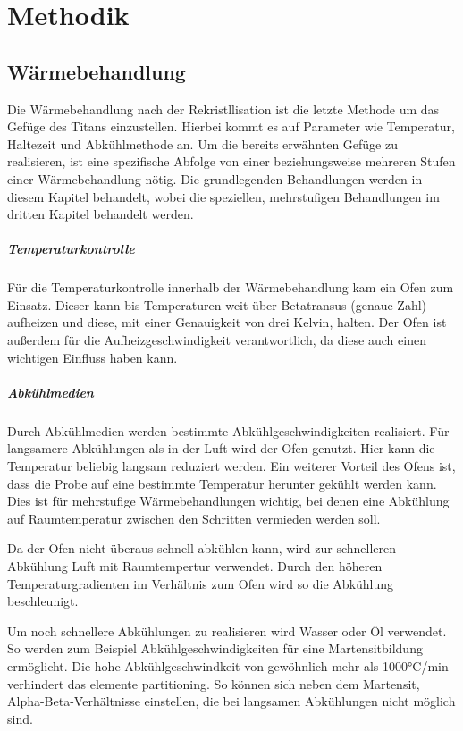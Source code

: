 \documentclass[a4paper, 11pt]{tubsreprt}
\begin{document}
\chapter{Methodik}
\section{Wärmebehandlung}

Die Wärmebehandlung nach der Rekristllisation ist die letzte Methode um das Gefüge des Titans einzustellen. Hierbei kommt es auf Parameter wie Temperatur, Haltezeit und Abkühlmethode an. Um die bereits erwähnten Gefüge zu realisieren, ist eine spezifische Abfolge von einer beziehungsweise mehreren Stufen einer Wärmebehandlung nötig. Die grundlegenden Behandlungen werden in diesem Kapitel behandelt, wobei die speziellen, mehrstufigen Behandlungen im dritten Kapitel behandelt werden.
\paragraph{Temperaturkontrolle}
Für die Temperaturkontrolle innerhalb der Wärmebehandlung kam ein Ofen zum Einsatz. Dieser kann bis Temperaturen weit über Betatransus (genaue Zahl) aufheizen und diese, mit einer Genauigkeit von drei Kelvin, halten. Der Ofen ist außerdem für die Aufheizgeschwindigkeit verantwortlich, da diese auch einen wichtigen Einfluss haben kann.
\paragraph{Abkühlmedien}

Durch Abkühlmedien werden bestimmte Abkühlgeschwindigkeiten realisiert. Für langsamere Abkühlungen als in der Luft wird der Ofen genutzt. Hier kann die Temperatur beliebig langsam reduziert werden. Ein weiterer Vorteil des Ofens ist, dass die Probe auf eine bestimmte Temperatur herunter gekühlt werden kann. Dies ist für mehrstufige Wärmebehandlungen wichtig, bei denen eine Abkühlung auf Raumtemperatur zwischen den Schritten vermieden werden soll. 

Da der Ofen nicht überaus schnell abkühlen kann, wird zur schnelleren Abkühlung Luft mit Raumtempertur verwendet. Durch den höheren Temperaturgradienten im Verhältnis zum Ofen wird so die Abkühlung beschleunigt.  

Um noch schnellere Abkühlungen zu realisieren wird Wasser oder Öl verwendet. So werden zum Beispiel Abkühlgeschwindigkeiten für eine Martensitbildung ermöglicht. Die hohe Abkühlgeschwindkeit von gewöhnlich mehr als 1000°C/min verhindert das elemente partitioning. So können sich neben dem Martensit, Alpha-Beta-Verhältnisse einstellen, die bei langsamen Abkühlungen nicht möglich sind. 
\end{document}
